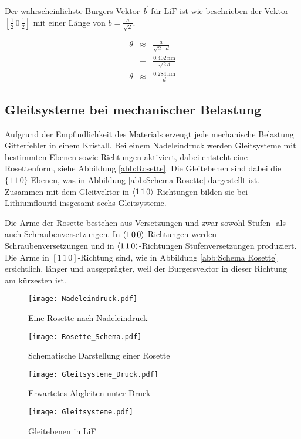 \documentclass[12pt,a4paper]{scrartcl}
\numberwithin{equation}{section} %
\renewcommand{\[}{} %
\renewcommand{\]}{\noindent} %
\begin{document}
\noindent
Der wahrscheinlichste Burgers-Vektor \(\vec{b}\) für \(\mathrm{LiF}\) ist wie beschrieben der Vektor \([\frac{1}{2}\,0\,\frac{1}{2}]\) mit einer Länge von \(b = \frac{a}{\sqrt{2}}\).
\[
\begin{eqnarray}
    \theta &\approx& \frac{a}{\sqrt{2} \cdot d} \\
        &=& \frac{0.402\,\mathrm{nm}}{\sqrt{2} d}\\
    \theta &\approx& \frac{0.284\,\mathrm{nm}}{d} \label{theta}
\end{eqnarray}
\]

\hypertarget{gleitsysteme-bei-mechanischer-belastung}{%
\subsection{Gleitsysteme bei mechanischer
Belastung}\label{gleitsysteme-bei-mechanischer-belastung}}

Aufgrund der Empfindlichkeit des Materials erzeugt jede mechanische
Belastung Gitterfehler in einem Kristall. Bei einem Nadeleindruck werden
Gleitsysteme mit bestimmten Ebenen sowie Richtungen aktiviert, dabei
entsteht eine Rosettenform, siehe Abbildung \ref{abb:Rosette}. Die Gleitebenen sind dabei die \(\lbrace1\,1\,0\rbrace\)-Ebenen, was in Abbildung \ref{abb:Schema Rosette} dargestellt ist. Zusammen mit dem Gleitvektor in \(\expval{1\,1\,0}\)-Richtungen bilden sie bei Lithiumflourid insgesamt sechs Gleitsysteme.

Die Arme der Rosette bestehen aus Versetzungen und zwar sowohl Stufen-
als auch Schraubenversetzungen. In \(\expval{1\,0\,0}\)-Richtungen werden Schraubenversetzungen und in \(\expval{1\,1\,0}\)-Richtungen Stufenversetzungen produziert. Die Arme in \([1\,1\,0]\)-Richtung sind,
wie in Abbildung \ref{abb:Schema Rosette} ersichtlich, länger und ausgeprägter, weil der Burgersvektor in dieser Richtung am kürzesten ist.

\begin{figure}[ht]
	\begin{minipage}[t]{.3\linewidth}
		\texttt{[image: Nadeleindruck.pdf]}
		\caption{Eine Rosette nach Nadeleindruck \cite[S. 18]{Newey}}
		\label{abb:Rosette}
	\end{minipage}
	\begin{minipage}[t]{.3\linewidth}
		\texttt{[image: Rosette\_Schema.pdf]}
		\caption{Schematische Darstellung einer Rosette \cite[S. 21]{Newey}}
		\label{abb:Schema Rosette}
	\end{minipage}
	\begin{minipage}[t]{.3\linewidth}
		\texttt{[image: Gleitsysteme\_Druck.pdf]}
		\caption{Erwartetes Abgleiten unter Druck \cite[S. 2]{Newey}}
		\label{abb:Gleitebene}
	\end{minipage}

	\begin{minipage}[t]{\linewidth}
		\centering
		\texttt{[image: Gleitsysteme.pdf]}
		\caption{Gleitebenen in LiF \cite[S. 9]{Newey} }
		\label{abb:Gleitebenen LiF}
	\end{minipage}
\end{figure}
\end{document}
